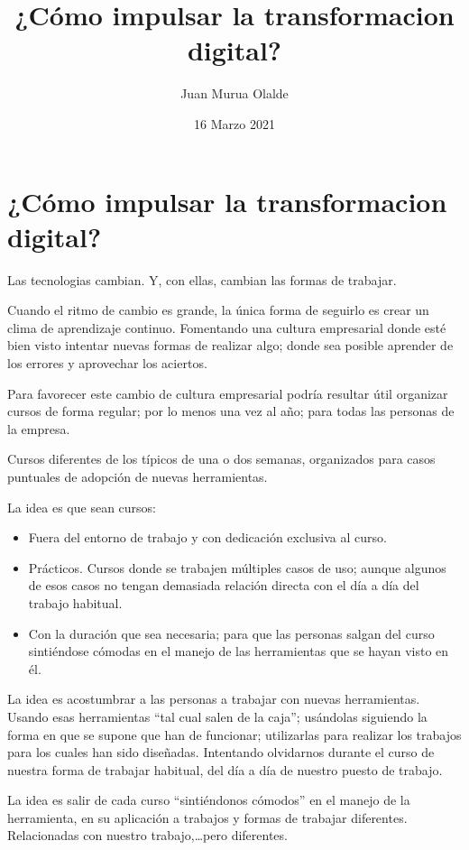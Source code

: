 \documentclass[11pt,a4paper]{article}
\title{¿Cómo impulsar la transformacion digital?}
\author{Juan Murua Olalde}
\date{16 Marzo 2021}
\begin{document}
\section*{¿Cómo impulsar la transformacion digital?}

Las tecnologias cambian. Y, con ellas, cambian las formas de trabajar. 

Cuando el ritmo de cambio es grande, la única forma de seguirlo es crear un clima de aprendizaje continuo. Fomentando una cultura empresarial donde esté bien visto intentar nuevas formas de realizar algo; donde sea posible aprender de los errores y aprovechar los aciertos.

Para favorecer este cambio de cultura empresarial podría resultar útil organizar cursos de forma regular; por lo menos una vez al año; para todas las personas de la empresa.

Cursos diferentes de los típicos de una o dos semanas, organizados para casos puntuales de adopción de nuevas herramientas.

La idea es que sean cursos:

\begin{itemize}

\item Fuera del entorno de trabajo y con dedicación exclusiva al curso. 

\item Prácticos. Cursos donde se trabajen múltiples casos de uso; aunque algunos de esos casos no tengan demasiada relación directa con el día a día del trabajo habitual.

\item Con la duración que sea necesaria; para que las personas salgan del curso sintiéndose cómodas en el manejo de las herramientas que se hayan visto en él.

\end{itemize}

La idea es acostumbrar a las personas a trabajar con nuevas herramientas. Usando esas herramientas ``tal cual salen de la caja''; usándolas siguiendo la forma en que se supone que han de funcionar; utilizarlas para realizar los trabajos para los cuales han sido diseñadas. Intentando olvidarnos durante el curso de nuestra forma de trabajar habitual, del día a día de nuestro puesto de trabajo.

La idea es salir de cada curso ``sintiéndonos cómodos'' en el manejo de la herramienta, en su aplicación a trabajos y formas de trabajar diferentes. Relacionadas con nuestro trabajo,\ldots pero diferentes.
\end{document}
